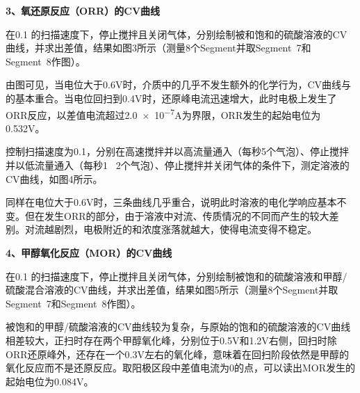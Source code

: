\noindent \textbf{3、氧还原反应（ORR）的CV曲线} \par
在0.1 的扫描速度下，停止搅拌且关闭气体，分别绘制被和饱和的硫酸溶液的CV曲线，并求出差值，结果如图3所示（测量8个Segment并取Segment\ 7和Segment\ 8作图）。\par
由图可见，当电位大于0.6V时，介质中的几乎不发生额外的化学行为，CV曲线与的基本重合。当电位回扫到0.4V时，还原峰电流迅速增大，此时电极上发生了ORR反应，以差值电流超过\num{2.0e-7}A为界限，ORR发生的起始电位为0.532V。\par 
控制扫描速度为0.1，分别在高速搅拌并以高流量通入（每秒5个气泡）、停止搅拌并以低流量通入（每秒1\my~ 2个气泡）、停止搅拌并关闭气体的条件下，测定溶液的CV曲线，如图4所示。\par 
同样在电位大于0.6V时，三条曲线几乎重合，说明此时溶液的电化学响应基本不变。但在发生ORR的部分，由于溶液中对流、传质情况的不同而产生的较大差别。对流越剧烈，电极附近的和浓度涨落就越大，使得电流变得不稳定。\par 
{}

\noindent \textbf{4、甲醇氧化反应（MOR）的CV曲线} \par
在0.1 的扫描速度下，停止搅拌且关闭气体，分别绘制被饱和的硫酸溶液和甲醇/硫酸混合溶液的CV曲线，并求出差值，结果如图5所示（测量8个Segment并取Segment\ 7和Segment\ 8作图）。\par
被饱和的甲醇/硫酸溶液的CV曲线较为复杂，与原始的饱和的硫酸溶液的CV曲线相差较大，正扫时存在两个甲醇氧化峰，分别位于0.5V和1.2V右侧，回扫时除ORR还原峰外，还存在一个0.3V左右的氧化峰，意味着在回扫阶段依然是甲醇的氧化反应而不是还原反应。取阳极区段中差值电流为0的点，可以读出MOR发生的起始电位为0.084V。

